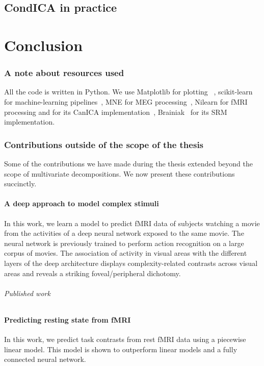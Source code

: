 \documentclass[ twoside,openright,titlepage,numbers=noenddot,%
                headinclude,footinclude,cleardoublepage=empty,abstract=on,
                BCOR=5mm,paper=a4,fontsize=11pt, 
                ]{scrreprt}
\begin{document}
\chapter{CondICA in practice}
\label{ch:condica2}


\part{Conclusion}

\section{A note about resources used}
All the code is written in Python.
We use Matplotlib for plotting~\cite{hunter2007matplotlib} , scikit-learn for
machine-learning pipelines~\cite{pedregosa2011scikit}, MNE for MEG
processing~\cite{gramfort2013meg}, Nilearn for fMRI processing and for its CanICA implementation~\cite{abraham2014machine}, Brainiak~\cite{kumar2020brainiak} for its SRM implementation. 


\section{Contributions outside of the scope of the thesis}
Some of the contributions we have made during the thesis extended beyond the scope of multivariate decompositions. We now present these contributions succinctly.

\subsection{A deep approach to model complex stimuli}
In this work, we learn a model to predict fMRI data of subjects watching a movie
from the activities of a deep neural network exposed to the same movie. The neural network is previously trained to perform action recognition on a large corpus of movies.
The association of activity in visual areas with the different layers of the
deep architecture displays complexity-related contrasts across visual areas and
reveals a striking foveal/peripheral dichotomy.

\paragraph{Published work}

\subsection{Predicting resting state from fMRI}
In this work, we predict task contrasts from rest fMRI data using a piecewise
  linear model. This model is shown to outperform linear models and a fully
  connected neural network.
\end{document}
